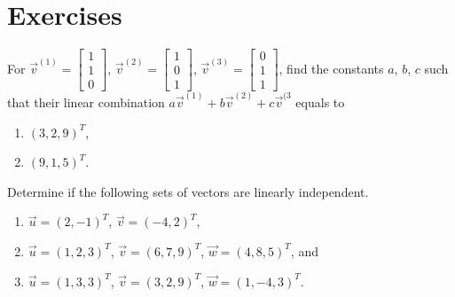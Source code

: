 \section{Exercises}

\begin{Exercise}
For $\vec{v}^{(1)} =
\begin{bmatrix}
1\\
1\\
0
\end{bmatrix}$,
$\vec{v}^{(2)} =
\begin{bmatrix}
1\\
0\\
1
\end{bmatrix}$,
$\vec{v}^{(3)} =
\begin{bmatrix}
0\\
1\\
1
\end{bmatrix}$,
find the constants $a$, $b$, $c$ such that their linear combination $a\vec{v}^{(1)} + b\vec{v}^{(2)} + c\vec{v}^{(3}$ equals to 
\begin{enumerate}[label=(\alph*)]
\item $(3,2,9)^T$, 
\item $(9,1,5)^T$.
\end{enumerate}
\end{Exercise}

\begin{Exercise}
Determine if the following sets of vectors are linearly independent.
\begin{enumerate}[label=(\alph*)]
\item $\vec{u} = (2,-1)^T$, $\vec{v} = (-4,2)^T$,
\item $\vec{u} = (1,2,3)^T$, $\vec{v} = (6,7,9)^T$, $\vec{w} = (4,8,5)^T$, and
\item $\vec{u} = (1,3,3)^T$, $\vec{v}=(3,2,9)^T$, $\vec{w} = (1,-4,3)^T$.
\end{enumerate}
\end{Exercise}

